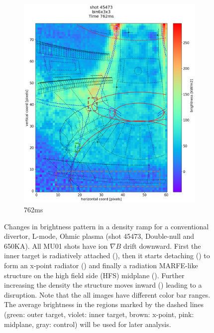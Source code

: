 \begin{figure}
\begin{subfigure}{0.4\linewidth}
         \includegraphics[trim={5 45 0 80},clip,width=\textwidth]{Chapters/chapter2/figs/IRVB-MASTU_shot-45473_export_38.png}
         \vspace*{-6.5mm}
         \caption{762ms}
         \label{fig:45473_export_5}
     \end{subfigure}
    \vspace*{-3mm}
    \caption{Changes in brightness pattern in a density ramp for a conventional divertor, L-mode, Ohmic plasma (shot 45473, Double-null and 650KA). All MU01 shots have ion $\nabla B$ drift downward. First the inner target is radiatively attached (), then it starts detaching () to form an x-point radiator () and finally a radiation MARFE-like structure on the high field side (HFS) midplane (). Further increasing the density the structure moves inward () leading to a disruption. Note that the all images have different color bar ranges. The average brightness in the regions marked by the dashed lines (green: outer target, violet: inner target, brown: x-point, pink: midplane, gray: control) will be used for later analysis.}
    \label{fig:45473_export}
\end{figure}

